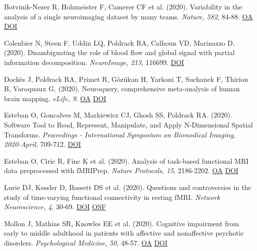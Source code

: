 \documentclass[10pt, letterpaper]{article}
\begin{document}
Botvinik-Nezer R, Holzmeister F, Camerer CF et al. (2020). Variability in the analysis of a single neuroimaging dataset by many teams. \textit{Nature, 582}, 84-88. \href{https://www.ncbi.nlm.nih.gov/pmc/articles/PMC7771346}{OA} \href{https://doi.org/10.1038/s41586-020-2314-9}{DOI} \vspace{2mm}

Colenbier N, Steen F, Uddin LQ, Poldrack RA, Calhoun VD, Marinazzo D.  (2020). Disambiguating the role of blood flow and global signal with partial information decomposition. \textit{NeuroImage, 213}, 116699. \href{https://doi.org/10.1016/j.neuroimage.2020.116699}{DOI} \vspace{2mm}

Dockès J, Poldrack RA, Primet R, Gözükan H, Yarkoni T, Suchanek F, Thirion B, Varoquaux G.  (2020). Neuroquery, comprehensive meta-analysis of human brain mapping. \textit{eLife, 9}. \href{https://www.ncbi.nlm.nih.gov/pmc/articles/PMC7164961}{OA} \href{https://doi.org/10.7554/elife.53385}{DOI} \vspace{2mm}

Esteban O, Goncalves M, Markiewicz CJ, Ghosh SS, Poldrack RA.  (2020). Software Tool to Read, Represent, Manipulate, and Apply N-Dimensional Spatial Transforms. \textit{Proceedings - International Symposium on Biomedical Imaging, 2020-April}, 709-712. \href{https://doi.org/10.1109/isbi45749.2020.9098466}{DOI} \vspace{2mm}

Esteban O, Ciric R, Finc K et al. (2020). Analysis of task-based functional MRI data preprocessed with fMRIPrep. \textit{Nature Protocols, 15}, 2186-2202. \href{https://www.ncbi.nlm.nih.gov/pmc/articles/PMC7404612}{OA} \href{https://doi.org/10.1038/s41596-020-0327-3}{DOI} \vspace{2mm}

Lurie DJ, Kessler D, Bassett DS et al. (2020). Questions and controversies in the study of time-varying functional connectivity in resting fMRI. \textit{Network Neuroscience, 4}, 30-69. \href{https://doi.org/10.1162/netn_a_00116}{DOI} \href{https://osf.io/fa6zr/}{OSF} \vspace{2mm}

Mollon J, Mathias SR, Knowles EE et al. (2020). Cognitive impairment from early to middle adulthood in patients with affective and nonaffective psychotic disorders. \textit{Psychological Medicine, 50}, 48-57. \href{https://www.ncbi.nlm.nih.gov/pmc/articles/PMC7086288}{OA} \href{https://doi.org/10.1017/s0033291718003938}{DOI} \vspace{2mm}
\end{document}
